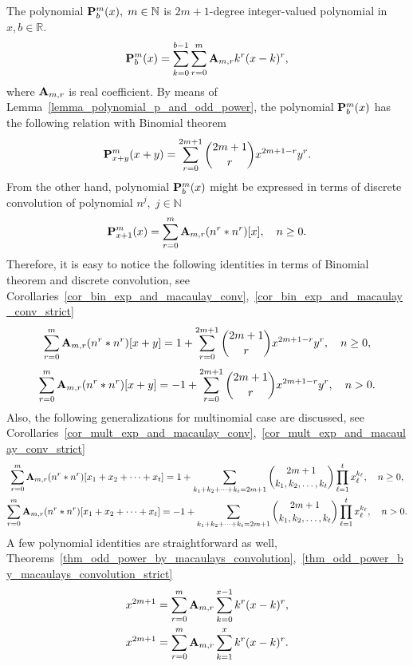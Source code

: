 The polynomial $\polynomialP{m}{b}{x}, \; m\in\mathbb{N}$ is $2m+1$-degree integer-valued polynomial in $x,b\in\mathbb{R}$.
\[
    \polynomialP{m}{b}{x} = \sum_{k=0}^{b-1} \sum_{r=0}^{m} \coeffA{m}{r} k^r(x-k)^r,
\]
where $\coeffA{m}{r}$ is real coefficient.
By means of Lemma~\ref{lemma_polynomial_p_and_odd_power},
the polynomial $\polynomialP{m}{b}{x}$ has the following relation with Binomial theorem~\cite{AbraSteg72}
\[
    \polynomialP{m}{x+y}{x+y} = \sum_{r=0}^{2m+1} \binom{2m+1}{r} x^{2m+1-r} y^r.
\]
From the other hand, polynomial $\polynomialP{m}{b}{x}$ might be expressed in terms of discrete convolution
of polynomial $n^j, \; j\in \mathbb{N}$
\[
    \polynomialP{m}{x+1}{x} = \sum_{r=0}^{m} \coeffA{m}{r} \convPower{n}{r}{x}, \quad n\geq 0.
\]
Therefore, it is easy to notice the following identities in terms of Binomial theorem and discrete convolution,
see Corollaries~\ref{cor_bin_exp_and_macaulay_conv},~\ref{cor_bin_exp_and_macaulay_conv_strict}
\begin{equation*}
    \sum_{r=0}^{m} \coeffA{m}{r} \convPower{n}{r}{x+y}
    =
    1 + \sum_{r=0}^{2m+1} \binom{2m+1}{r} x^{2m+1-r} y^r, \quad n \geq 0,
\end{equation*}
\begin{equation*}
    \sum_{r=0}^{m} \coeffA{m}{r} \convPower{n}{r}{x+y}
    =
    -1 + \sum_{r=0}^{2m+1} \binom{2m+1}{r} x^{2m+1-r} y^r, \quad n > 0.
\end{equation*}
Also, the following generalizations for multinomial case are discussed,
see Corollaries~\ref{cor_mult_exp_and_macaulay_conv},~\ref{cor_mult_exp_and_macaulay_conv_strict}
\begin{gather*}
    \sum_{r=0}^{m} \coeffA{m}{r} \convPower{n}{r}{\multifoldSum{t}} =
    1 + \sum_{\multifoldSum[k]{t}=2m+1} \binom{2m+1}{k_1, k_2,\ldots, k_t} \prod_{\ell=1}^{t} x_\ell^{k_\ell},
    \quad n \geq 0,\\
    \sum_{r=0}^{m} \coeffA{m}{r} \convPower{n}{r}{\multifoldSum{t}} =
    -1 + \sum_{\multifoldSum[k]{t}=2m+1} \binom{2m+1}{k_1, k_2,\ldots, k_t} \prod_{\ell=1}^{t} x_\ell^{k_\ell},
    \quad n > 0.\\
\end{gather*}
A few polynomial identities are straightforward as well,
Theorems~\ref{thm_odd_power_by_macaulays_convolution},~\ref{thm_odd_power_by_macaulays_convolution_strict}
\begin{gather*}
    x^{2m+1} = \sum_{r=0}^{m} \coeffA{m}{r} \sum_{k=0}^{x-1} k^r (x-k)^r,\\
    x^{2m+1} = \sum_{r=0}^{m} \coeffA{m}{r} \sum_{k=1}^{x} k^r (x-k)^r.\\
\end{gather*}
